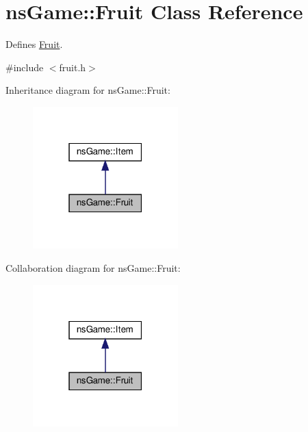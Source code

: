 \hypertarget{classns_game_1_1_fruit}{}\section{ns\+Game\+:\+:Fruit Class Reference}
\label{classns_game_1_1_fruit}


Defines \hyperlink{classns_game_1_1_fruit}{Fruit}.  




{\ttfamily \#include $<$fruit.\+h$>$}



Inheritance diagram for ns\+Game\+:\+:Fruit\+:\nopagebreak
\begin{figure}[H]
\begin{center}
\leavevmode
\includegraphics[width=159pt]{classns_game_1_1_fruit__inherit__graph}
\end{center}
\end{figure}


Collaboration diagram for ns\+Game\+:\+:Fruit\+:\nopagebreak
\begin{figure}[H]
\begin{center}
\leavevmode
\includegraphics[width=159pt]{classns_game_1_1_fruit__coll__graph}
\end{center}
\end{figure}

